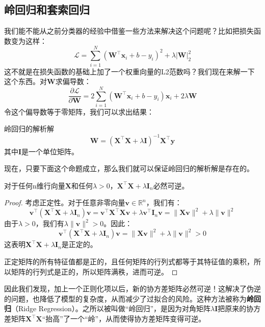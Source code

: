 \subsection{岭回归和套索回归}

我们能不能从之前分类器的经验中借鉴一些方法来解决这个问题呢？比如把损失函数变为这样：
\[ \mathcal{L} = \sum_{i=1}^{N} (\mathbf{W}^\top \mathbf{x}_i + b - y_i)^2 + \lambda \left|\mathbf{W}\right|_2^2 \]
这不就是在损失函数的基础上加了一个权重向量的L2范数吗？我们现在来解一下这个东西。对$\mathbf{W}$求偏导数：
\[ \frac{\partial \mathcal{L}}{\partial \mathbf{W}} = 2 \sum_{i=1}^{N} (\mathbf{W}^\top \mathbf{x}_i + b - y_i) \mathbf{x}_i + 2\lambda \mathbf{W} \]
令这个偏导数等于零矩阵，我们可以求出结果：

\begin{theorem}{岭回归的解析解}{}
\[ \mathbf{W} = (\mathbf{X}^\top \mathbf{X} + \lambda \mathbf{I})^{-1} \mathbf{X}^\top \mathbf{y} \]
其中$\mathbf{I}$是一个单位矩阵。
\end{theorem}

现在，只要下面这个命题成立，那么我们就可以保证岭回归的解析解是存在的。
\begin{proposition}{}{}
    对于任何n维行向量$\mathbf{X}$和任何$\lambda > 0$，$\mathbf{X}^\top \mathbf{X} + \lambda \mathbf{I}_n$必然可逆。
\end{proposition}{}{}

\begin{proof}
    考虑正定性。对于任意非零向量$\mathbf{v} \in \mathbb{R}^n$，我们有：
    \[\mathbf{v}^\top (\mathbf{X}^\top \mathbf{X} + \lambda \mathbf{I}_n) \mathbf{v} = \mathbf{v}^\top \mathbf{X}^\top \mathbf{X} \mathbf{v} + \lambda \mathbf{v}^\top \mathbf{I}_n \mathbf{v} = \|\mathbf{X} \mathbf{v}\|^2 + \lambda \|\mathbf{v}\|^2\]
    由于$\lambda > 0$，我们有$\lambda \|\mathbf{v}\|^2 > 0$。因此：
    \[\mathbf{v}^\top (\mathbf{X}^\top \mathbf{X} + \lambda \mathbf{I}_n) \mathbf{v} = \|\mathbf{X} \mathbf{v}\|^2 + \lambda \|\mathbf{v}\|^2 > 0\]
    这表明$\mathbf{X}^\top \mathbf{X} + \lambda \mathbf{I}_n$是正定的。

    正定矩阵的所有特征值都是正的，且任何矩阵的行列式都等于其特征值的乘积，所以矩阵的行列式是正的，所以矩阵满秩，进而可逆。
\end{proof}

因此我们发现，加上一个正则化项以后，新的协方差矩阵必然可逆！这解决了伪逆的问题，也降低了模型的复杂度，从而减少了过拟合的风险。这种方法被称为\textbf{岭回归}（Ridge Regression）。之所以被叫做“岭回归”，是因为对角矩阵$\lambda \mathbf{I}$把原来的协方差矩阵$\mathbf{X}^\top \mathbf{X}$“抬高”了一个“岭”，从而使得协方差矩阵变得可逆。

